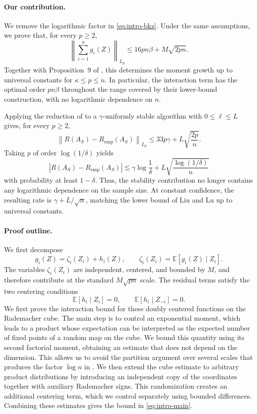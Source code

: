 \documentclass[11pt]{article}
\newcommand{\E}{\mathbb{E}}
\newcommand{\norm}[1]{\left\lVert #1\right\rVert}
\newcommand{\abs}[1]{\left\lvert #1\right\rvert}
\begin{document}
\paragraph{Our contribution.}
We remove the logarithmic factor in \eqref{eq:intro-bkz}. Under the same assumptions, we prove that, for every \(p\ge2\),
\begin{equation}\label{eq:intro-main}
\norm{\sum_{i=1}^n g_i(Z)}_{L_p}
\le
16pn\beta+M\sqrt{2pn}.
\end{equation}
Together with Proposition~9 of \cite{bkz2020}, this determines the moment growth up to universal constants for \(\kappa\le p\le n\). In particular, the interaction term has the optimal order \(pn\beta\) throughout the range covered by their lower-bound construction, with no logarithmic dependence on \(n\).

Applying the reduction of \cite{bkz2020} to a \(\gamma\)-uniformly stable algorithm with \(0\le\ell\le L\) gives, for every \(p\ge2\),
\[
\norm{R(A_S)-R_{\mathrm{emp}}(A_S)}_{L_p}
\le
33p\gamma
+
L\sqrt{\frac{2p}{n}}.
\]
Taking \(p\) of order \(\log(1/\delta)\) yields
\[
\abs{R(A_S)-R_{\mathrm{emp}}(A_S)}
\lesssim
\gamma\log\frac1\delta
+
L\sqrt{\frac{\log(1/\delta)}{n}}
\]
with probability at least \(1-\delta\). Thus, the stability contribution no longer contains any logarithmic dependence on the sample size. At constant confidence, the resulting rate is \(\gamma+L/\sqrt n\), matching the lower bound of Liu and Lu \cite{liulu2020lower} up to universal constants.

\paragraph{Proof outline.}
We first decompose
\[
g_i(Z)=\zeta_i(Z_i)+h_i(Z), \qquad \zeta_i(Z_i)=\E[g_i(Z)\mid Z_i].
\]
The variables \(\zeta_i(Z_i)\) are independent, centered, and bounded by \(M\), and therefore contribute at the standard \(M\sqrt{pn}\) scale. The residual terms satisfy the two centering conditions
\[
\E[h_i\mid Z_i]=0, \qquad \E[h_i\mid Z_{-i}]=0.
\]
We first prove the interaction bound for these doubly centered functions on the Rademacher cube. The main step is to control an exponential moment, which leads to a product whose expectation can be interpreted as the expected number of fixed points of a random map on the cube. We bound this quantity using its second factorial moment, obtaining an estimate that does not depend on the dimension. This allows us to avoid the partition argument over several scales that produces the factor $\log n$ in \cite{bkz2020}. We then extend the cube estimate to arbitrary product distributions by introducing an independent copy of the coordinates together with auxiliary Rademacher signs. This randomization creates an additional centering term, which we control separately using bounded differences. Combining these estimates gives the bound in \eqref{eq:intro-main}. 
\end{document}
